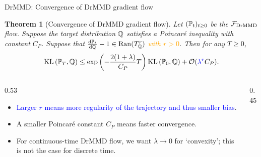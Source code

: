 \documentclass[aspectratio=169,xcolor=dvipsnames]{beamer}
\newtheorem{thm}{Theorem}
\newcommand{\orange}[1]{\textcolor{orange}{#1}}
\newcommand{\blue}[1]{\textcolor{blue}{#1}}
\begin{document}
\begin{frame}{DrMMD: Convergence of DrMMD gradient flow}
\begin{thm}[Convergence of DrMMD gradient flow]
Let $(\mathbb{P}_t)_{t\geq0}$ be the $\mathcal{F}_{\mathrm{DrMMD}}$ flow.
Suppose the target distribution $\mathbb{Q}$ satisfies a Poincaré inequality with constant $C_P$. Suppose that \orange{$\frac{\mathrm{d} \mathbb{P}_t}{\mathrm{d} \mathbb{Q}}-1 \in \operatorname{Ran}(T_{\mathbb{Q}}^r)$ with $r>0$}. Then for any $T \geq 0$,
\begin{align*}
    \kl\left(\Pb_T, \Qb\right) \leq \exp \left(-\frac{2(1+\lambda)}{C_P} T\right) \kl\left(\Pb_0, \Qb\right)+ \calO(\blue{\lambda^r} C_P) .
\end{align*}
\end{thm}
\vspace{-4pt}
\begin{columns}[T,onlytextwidth]
\begin{column}{0.53\textwidth}
\small
\begin{itemize}
    \item \blue{Larger $r$ means more regularity of the trajectory and thus smaller bias}.
    \item A smaller Poincar\'{e} constant $C_P$ means faster convergence.
    \item For continuous-time DrMMD flow, we want $\lambda\to0$ for `convexity'; this is not the case for discrete time.
\end{itemize}
\end{column}
\begin{column}{0.45\textwidth}
\centering
{}
\end{column}
\end{columns}
\end{frame}
\end{document}
